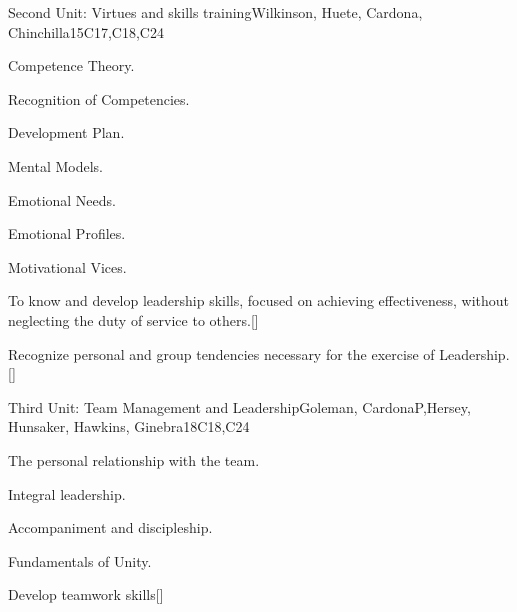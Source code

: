 \begin{syllabus}
\begin{unit}{}{Second Unit: Virtues and skills training}{Wilkinson, Huete, Cardona, Chinchilla}{15}{C17,C18,C24}
\begin{topics}
	
	\item Competence Theory.
	\item Recognition of Competencies.
	\item Development Plan.
	\item Mental Models.
	\item Emotional Needs.
	\item Emotional Profiles.
	\item Motivational Vices.

\end{topics}
\begin{learningoutcomes}
	\item To know and develop leadership skills, focused on achieving effectiveness, without neglecting the duty of service to others.[\Familiarity]
	\item Recognize personal and group tendencies necessary for the exercise of Leadership.[\Familiarity]
\end{learningoutcomes}
\end{unit}

\begin{unit}{}{Third Unit: Team Management and Leadership}{Goleman, CardonaP,Hersey, Hunsaker, Hawkins, Ginebra}{18}{C18,C24}
\begin{topics}
	\item The personal relationship with the team.
	\item Integral leadership.
	\item Accompaniment and discipleship.
	\item Fundamentals of Unity.
\end{topics}
\begin{learningoutcomes}
	\item Develop teamwork skills[\Familiarity]
\end{learningoutcomes}
\end{unit}

\begin{coursebibliography}
\end{coursebibliography}

\end{syllabus}
